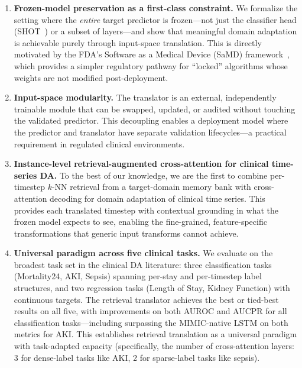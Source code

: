 \begin{enumerate}[leftmargin=*,itemsep=2pt]

\item \textbf{Frozen-model preservation as a first-class constraint.}
We formalize the setting where the \emph{entire} target predictor is frozen---not
just the classifier head (SHOT~\cite{liang2020shot}) or a subset of layers---and
show that meaningful domain adaptation is achievable purely through input-space
translation.
This is directly motivated by the FDA's Software as a Medical Device (SaMD)
framework~\cite{fda2021samd}, which provides a simpler regulatory pathway for
``locked'' algorithms whose weights are not modified post-deployment.

\item \textbf{Input-space modularity.}
The translator is an external, independently trainable module that can be
swapped, updated, or audited without touching the validated predictor.
This decoupling enables a deployment model where the predictor and translator
have separate validation lifecycles---a practical requirement in regulated
clinical environments.

\item \textbf{Instance-level retrieval-augmented cross-attention for clinical
time-series DA.}
To the best of our knowledge, we are the first to combine per-timestep $k$-NN
retrieval from a target-domain memory bank with cross-attention decoding for
domain adaptation of clinical time series.
This provides each translated timestep with contextual grounding in what the
frozen model expects to see, enabling the fine-grained, feature-specific
transformations that generic input transforms cannot achieve.

\item \textbf{Universal paradigm across five clinical tasks.}
We evaluate on the broadest task set in the clinical DA literature:
three classification tasks (Mortality24, AKI, Sepsis) spanning per-stay and
per-timestep label structures, and two regression tasks (Length of Stay, Kidney
Function) with continuous targets.
The retrieval translator achieves the best or tied-best results on all five,
with improvements on both AUROC and AUCPR for all classification tasks---including
surpassing the MIMIC-native LSTM on both metrics for AKI.
This establishes retrieval translation as a universal paradigm with task-adapted capacity
(specifically, the number of cross-attention layers: 3 for dense-label tasks
like AKI, 2 for sparse-label tasks like sepsis).


\end{enumerate}
